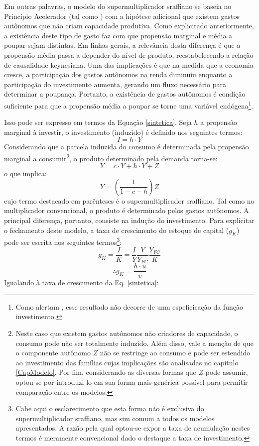 Em outras palavras, o modelo do supermultiplicador sraffiano se baseia no Princípio Acelerador (tal como \textcite{harrod_essay_1939}) com a hipótese adicional que existem gastos autônomos que não criam capacidade produtiva. Como explicitado anteriormente, a existência deste tipo de gasto faz com que propensão marginal e média a poupar sejam distintas. Em linhas gerais, a relevância desta diferença é que a propensão média passa a depender do nível de produto, reestabelecendo a relação de causalidade keynesiana.  Uma das implicações é que na medida que a economia cresce, a participação dos gastos autônomos na renda diminuiu enquanto a participação do investimento aumenta, gerando um fluxo necessário para determinar a poupança. Portanto, a existência de gastos autônomos é condição suficiente para que a propensão média a poupar se torne uma variável endógena\footnote{Como alertam \textcite{serrano_sraffian_2017}, esse resultado não decorre de uma espeficicação da função investimento.}.

Isso pode ser expresso em termos da Equação \ref{sintetica}. Seja $h$ a propensão marginal à investir, o investimento (induzido) é definido nos seguintes termos:
$$
I = h\cdot Y
$$
Considerando que a parcela induzida do consumo é determinada pela propensão marginal a consumir\footnote{Neste caso que existem gastos autônomos não criadores de capacidade, o consumo pode não ser totalmente induzido. Além disso, vale a menção de que o componente autônomo $Z$ não se restringe ao consumo e pode ser estendido ao investimento das famílias cujas implicações são analisadas no capitulo \ref{CapModelo}. Por fim, considerando as diversas formas que $Z$ pode assumir, optou-se por introduzi-lo em sua forma mais genérica possível para permitir comparação entre os modelos.}, o produto determinado pela demanda torna-se:
\begin{equation}
\label{PIBSuper}
    Y = c\cdot Y + h\cdot Y + Z
\end{equation}
o que implica:
\begin{equation}
\label{Supermultiplicador}
Y = \left(\frac{1}{1 - c - h}\right)Z
\end{equation}
cujo termo destacado em parênteses é o supermultiplicador sraffiano. Tal como no multiplicador convencional, o produto é determinado pelos gastos autônomos. A principal diferença, portanto, consiste na indução do investimento. Para explicitar o fechamento deste modelo, a taxa de crescimento do estoque de capital ($g_K$) pode ser escrita nos seguintes termos\footnote{Cabe aqui o esclarecimento que esta forma não é exclusiva do supermultiplicador sraffiano, mas sim comum a todos os modelos apresentados. A razão pela qual optou-se expor a taxa de acumulação nestes termos é meramente convencional dado o destaque a taxa de investimento.}:
$$
g_K = \frac{I}{K} = \frac{I}{Y}\frac{Y}{Y_{FC}}\frac{Y_{FC}}{K}
$$
$$
\therefore g_K = \frac{h\cdot u}{v}
$$
Igualando à taxa de crescimento da Eq. \ref{sintetica}:

